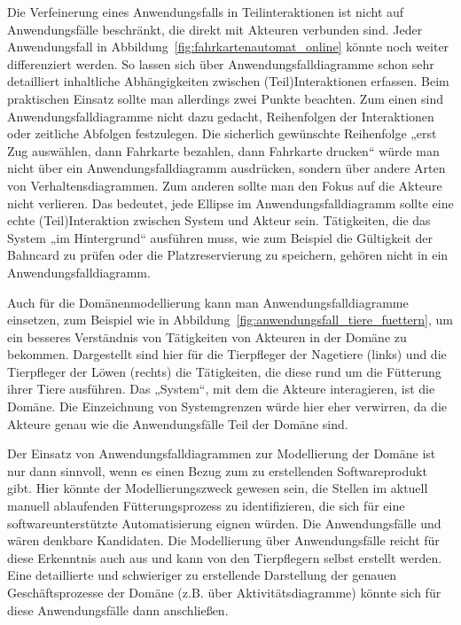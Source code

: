 Die Verfeinerung eines Anwendungsfalls in Teilinteraktionen ist nicht auf Anwendungsfälle beschränkt, die direkt mit Akteuren verbunden sind. Jeder Anwendungsfall in Abbildung~\ref{fig:fahrkartenautomat_online} könnte noch weiter differenziert werden. So lassen sich über Anwendungsfalldiagramme schon sehr detailliert inhaltliche Abhängigkeiten zwischen (Teil)Interaktionen erfassen. Beim praktischen Einsatz sollte man allerdings zwei Punkte beachten. Zum einen sind Anwendungsfalldiagramme nicht dazu gedacht, Reihenfolgen der Interaktionen oder zeitliche Abfolgen festzulegen. Die sicher\-lich gewünschte Reihenfolge „erst Zug auswählen, dann Fahrkarte bezahlen, dann Fahrkarte drucken“ würde man nicht über ein Anwendungsfalldiagramm ausdrücken, sondern über andere Arten von Verhaltensdiagrammen. Zum anderen sollte man den Fokus auf die Akteure nicht verlieren. Das bedeutet, jede Ellipse im Anwendungsfall\-diagramm sollte eine echte (Teil)Interaktion zwischen System und Akteur sein. Tätig\-keiten, die das System „im Hintergrund“ ausführen muss, wie zum Beispiel die Gültigkeit der Bahncard zu prüfen oder die Platzreservierung zu speichern, gehören nicht in ein Anwendungsfalldiagramm.

\vspace{1mm} %


Auch für die Domänenmodellierung kann man Anwendungsfalldiagramme einsetzen, zum Beispiel wie in Abbildung~\ref{fig:anwendungsfall_tiere_fuettern}, um ein besseres Verständnis von Tätigkeiten von Akteuren in der Domäne zu bekommen. Dargestellt sind hier für die Tierpfleger der Nagetiere (links) und die Tierpfleger der Löwen (rechts) die Tätigkeiten, die diese rund um die Fütterung ihrer Tiere ausführen. Das „System“, mit dem die Akteure interagieren, ist die Domäne. Die Einzeichnung von Systemgrenzen würde hier eher verwirren, da die Akteure genau wie die Anwendungsfälle Teil der Domäne sind.


Der Einsatz von Anwendungsfalldiagrammen zur Modellierung der Domäne ist nur dann sinnvoll, wenn es einen Bezug zum zu erstellenden Softwareprodukt gibt. Hier könnte der Modellierungszweck gewesen sein, die Stellen im aktuell manuell ablaufenden Fütterungsprozess zu identifizieren, die sich für eine softwareunterstützte Automatisierung eignen würden. Die Anwendungsfälle  und  wären denkbare Kandidaten. Die Modellierung über Anwendungsfälle reicht für diese Erkenntnis auch aus und kann von den Tier\-pflegern selbst erstellt werden. Eine detaillierte und schwieriger zu erstellende Darstellung der genauen Geschäftsprozesse der Domäne (z.B. über Aktivitätsdiagramme) könnte sich für diese Anwendungsfälle dann anschließen.

